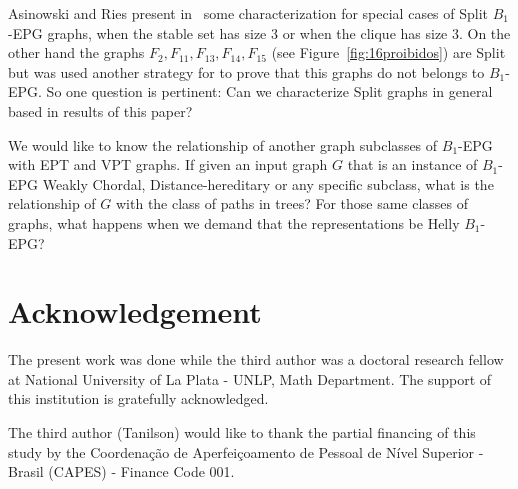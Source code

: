 \documentclass[9pt]{entcs}
\begin{document}
Asinowski and Ries present in~\cite{ries2009} some characterization for special cases of Split $B_1$-EPG graphs, when the stable set has size 3 or when the clique has size 3. On the other hand the graphs $F_2, F_{11}, F_{13}, F_{14}, F_{15}$ (see Figure~\ref{fig:16proibidos}) are Split but was used another strategy for to prove that this graphs do not belongs to $B_1$-EPG. So one question is pertinent: Can we characterize Split graphs in general based in results of this paper? 

We would like to know the relationship of another graph subclasses of $B_1$-EPG with EPT and VPT graphs. If given an  input graph $G$ that is an instance of $B_1$-EPG  Weakly Chordal,  Distance-hereditary or any specific subclass, what is the relationship of $G$ with the class of paths in trees? For those same classes of graphs, what happens when we demand that the representations be Helly $B_1$-EPG?


 



\section*{Acknowledgement}

The present work was done while the third author was a doctoral research fellow at National University of La Plata - UNLP, Math Department. The support of this institution is gratefully acknowledged.

The third author (Tanilson) would like to thank the partial financing of this study by the Coordena{\c c}\~ao de Aperfei{\c c}oamento de Pessoal de N\'ivel Superior - Brasil (CAPES) - Finance Code 001.

\newcommand{\newblock}{} %

\end{document}
